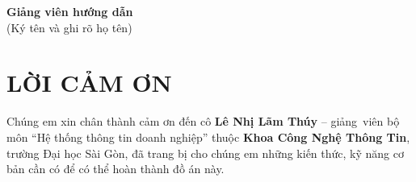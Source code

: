 \documentclass[a4paper,12pt]{report}
\begin{document}
\vspace{0.5cm}

\noindent\makebox[\textwidth]{\dotfill}

\vspace{0.5cm}
\noindent\makebox[\textwidth]{\dotfill}

\vspace{0.5cm}
\noindent\makebox[\textwidth]{\dotfill}

\vspace{0.5cm}
\noindent\makebox[\textwidth]{\dotfill}

\vspace{0.5cm}
\noindent\makebox[\textwidth]{\dotfill}

\vspace{0.5cm}
\noindent\makebox[\textwidth]{\dotfill}

\vspace{0.5cm}
\noindent\makebox[\textwidth]{\dotfill}

\vspace{0.5cm}
\noindent\makebox[\textwidth]{\dotfill}

\vspace{0.5cm}
\noindent\makebox[\textwidth]{\dotfill}

\vspace{0.5cm}
\noindent\makebox[\textwidth]{\dotfill}

\vspace{0.5cm}
\noindent\makebox[\textwidth]{\dotfill}

\vspace{0.5cm}
\noindent\makebox[\textwidth]{\dotfill}

\vspace{0.5cm}
\noindent\makebox[\textwidth]{\dotfill}

\vspace{2cm}
\begin{flushright}
    \textbf{Giảng viên hướng dẫn}\\[0.2cm]
    (Ký tên và ghi rõ họ tên)
\end{flushright}

\newpage
\chapter*{\centering LỜI CẢM ƠN}

\justifying
\quad Chúng em xin chân thành cảm ơn đến cô \textbf{Lê Nhị Lãm Thúy} – giảng~viên bộ môn “Hệ thống thông tin doanh nghiệp” thuộc \textbf{Khoa Công Nghệ Thông Tin}, trường Đại học Sài Gòn, đã trang bị cho chúng em những kiến thức, kỹ năng cơ bản cần có để có thể hoàn thành đồ án này.
\end{document}
